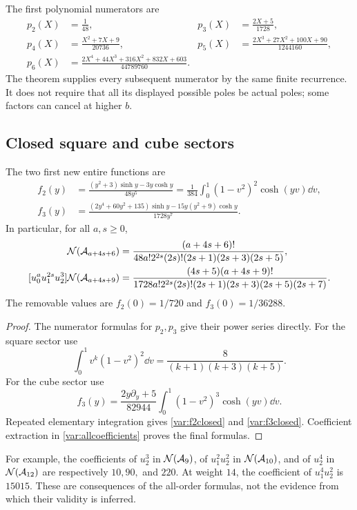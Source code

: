 The first polynomial numerators are
\begin{align*}
 p_2(X)&=\frac1{48},&
 p_3(X)&=\frac{2X+5}{1728},\\
 p_4(X)&=\frac{X^2+7X+9}{20736},&
 p_5(X)&=\frac{2X^3+27X^2+100X+90}{1244160},\\
 p_6(X)&=\frac{2X^4+44X^3+316X^2+832X+603}{44789760}.
\end{align*}
The theorem supplies every subsequent numerator by the same finite
recurrence. It does not require that all its displayed possible poles
be actual poles; some factors can cancel at higher $b$.

\subsection{Closed square and cube sectors}

\begin{corollary}
\label{var:squarecube}
The two first new entire functions are
\begin{align}
 f_2(y)&=\frac{(y^2+3)\sinh y-3y\cosh y}{48y^5}
       =\frac1{384}\int_0^1(1-v^2)^2\cosh(yv)\dd v,
       \label{var:f2closed}\\
 f_3(y)&=\frac{(2y^4+60y^2+135)\sinh y
                -15y(y^2+9)\cosh y}{1728y^7}.
       \label{var:f3closed}
\end{align}
In particular, for all $a,s\ge0$,
\begin{align}
 [u_0^au_1^{2s}u_2^2]\NN(\Acal_{a+4s+6})
 &=\frac{(a+4s+6)!}
 {48a!2^{2s}(2s)!(2s+1)(2s+3)(2s+5)},
 \label{var:squarecoeff}\\
 [u_0^au_1^{2s}u_2^3]\NN(\Acal_{a+4s+9})
 &=\frac{(4s+5)(a+4s+9)!}
 {1728a!2^{2s}(2s)!(2s+1)(2s+3)(2s+5)(2s+7)}.
 \label{var:cubecoeff}
\end{align}
The removable values are $f_2(0)=1/720$ and $f_3(0)=1/36288$.
\end{corollary}
\begin{proof}
The numerator formulas for $p_2,p_3$ give their power series directly.
For the square sector use
\[
 \int_0^1v^k(1-v^2)^2\dd v
 =\frac8{(k+1)(k+3)(k+5)}.
\]
For the cube sector use
\[
 f_3(y)=\frac{2y\partial_y+5}{82944}
                \int_0^1(1-v^2)^3\cosh(yv)\dd v.
\]
Repeated elementary integration gives \eqref{var:f2closed} and
\eqref{var:f3closed}. Coefficient extraction in
\eqref{var:allcoefficients} proves the final formulas.
\end{proof}

For example, the coefficients of $u_2^3$ in $\mathcal N(\mathcal A_9)$,
of $u_1^2u_2^2$ in $\mathcal N(\mathcal A_{10})$, and of $u_2^4$ in
$\mathcal N(\mathcal A_{12})$ are respectively $10,90,$ and $220$.
At weight $14$, the coefficient of $u_1^4u_2^2$ is $15015$.
These are consequences of the all-order formulas, not the evidence
from which their validity is inferred.

